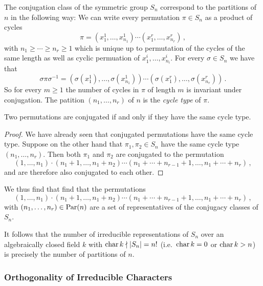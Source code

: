 \begin{example}
  \label{example: conjugacy classes of symmetric group}
  The conjugation class of the symmetric group $S_n$ correspond to the partitions of $n$ in the following way:
  We can write every permutation $\pi \in S_n$ as a product of cycles
  \[
      \pi
    = \left( x^1_1, \dotsc, x^1_{n_1} \right)
      \dotsm
      \left( x^r_1, \dotsc, x^r_{n_r} \right) \,,
  \]
  with $n_1 \geq \dotsb \geq n_r \geq 1$ which is unique up to permutation of the cycles of the same length as well as cyclic permuation of $x^i_1, \dotsc, x^i_{n_i}$.
  For every $\sigma \in S_n$ we have that
  \[
      \sigma \pi \sigma^{-1}
    = \left( \sigma(x^1_1), \dotsc, \sigma(x^1_{n_1}) \right)
      \dotsm
      \left( \sigma(x^r_1), \dotsc, \sigma(x^r_{n_r}) \right) \,.
  \]
  So for every $m \geq 1$ the number of cycles in $\pi$ of length $m$ is invariant under conjugation.
  The patition $(n_1, \dotsc, n_r)$ of $n$ is the \emph{cycle type} of $\pi$.
  
  \begin{claim}
    Two permutations are conjugated if and only if they have the same cycle type.
  \end{claim}
  
  \begin{proof}
    We have already seen that conjugated permutations have the same cycle type.
    Suppose on the other hand that $\pi_1, \pi_2 \in S_n$ have the same cycle type $(n_1, \dotsc, n_r)$.
    Then both $\pi_1$ and $\pi_2$ are conjugated to the permutation
    \[
              (1, \dotsc, n_1)
      \cdot   (n_1 + 1, \dotsc, n_1 + n_2)
      \dotsm  (n_1 + \dotsb + n_{r-1} + 1, \dotsc, n_1 + \dotsb + n_r) \,,
    \]
    and are therefore also conjugated to each other.
  \end{proof}
  We thus find that find that the permutations
  \[
            (1, \dotsc, n_1)
    \cdot   (n_1 + 1, \dotsc, n_1 + n_2)
    \dotsm  (n_1 + \dotsb + n_{r-1} + 1, \dotsc, n_1 + \dotsb + n_r) \,,
  \]
  with $(n_1, \dotsc, n_r) \in \operatorname{Par}(n)$ are a set of representatives of the conjugacy classes of $S_n$.
  
  It follows that the number of irreducible representations of $S_n$ over an algebraically closed field $k$ with $\operatorname{char} k \nmid |S_n| = n!$ (i.e.\ $\operatorname{char} k = 0$ or $\operatorname{char} k > n$) is precisely the number of partitions of $n$.
\end{example}



\subsubsection{Orthogonality of Irreducible Characters}



